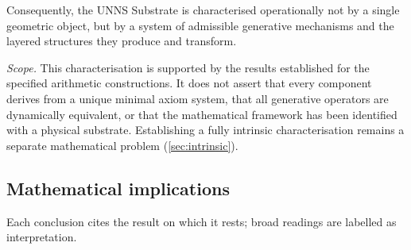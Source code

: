 Consequently, the UNNS Substrate is characterised operationally not by a single geometric object, but by a system of admissible generative mechanisms and the layered structures they produce and transform.

\emph{Scope.} This characterisation is supported by the results established for the specified arithmetic constructions. It does not assert that every component derives from a unique minimal axiom system, that all generative operators are dynamically equivalent, or that the mathematical framework has been identified with a physical substrate. Establishing a fully intrinsic characterisation remains a separate mathematical problem (\cref{sec:intrinsic}).

\subsection{Mathematical implications}\label{sec:implications}
Each conclusion cites the result on which it rests; broad readings are labelled as interpretation.
